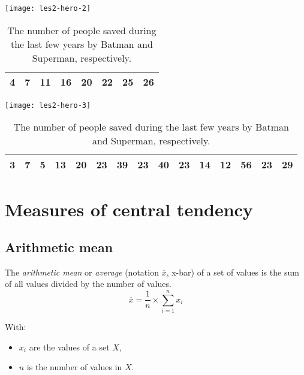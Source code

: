 \begin{table}
  
  \begin{center}
      \texttt{[image: les2-hero-2]}
    \begin{tabular}{|c|c|c|c|c|c|c|c|}
      \hline
      4 & 7 & 11 & 16 & 20 & 22 & 25 & 26 \\
      \hline
    \end{tabular}
  
    \texttt{[image: les2-hero-3]}
    \begin{tabular}{|c|c|c|c|c|c|c|c|c|c|c|c|c|c|c|}
      \hline
      3&7&5&13&20&23&39&23&40&23&14&12&56&23&29\\
      \hline
    \end{tabular}
  \end{center}
  
  \caption{The number of people saved during the last few years by Batman and Superman, respectively.}
  \label{tab:heroes-saves}
\end{table}

\section{Measures of central tendency}
\label{sec:measures-of-central-tendency}

\subsection{Arithmetic mean}
\label{ssec:arithmetic-mean}

\begin{definition}
  \label{def:mean}
  
  The \emph{arithmetic mean} or \emph{average} (notation $\overline{x}$, x-bar) of a set of values is the sum of all values divided by the number of values.
  \begin{equation}
    \overline{x} = \frac{1}{n} \times \sum_{i=1}^{n} x_{i}
    \label{eq:Mean}
  \end{equation}

  With:
  \begin{itemize}
    \item $x_{i}$ are the values of a set $X$,
    \item $n$ is the number of values in $X$.
  \end{itemize}
\end{definition}

